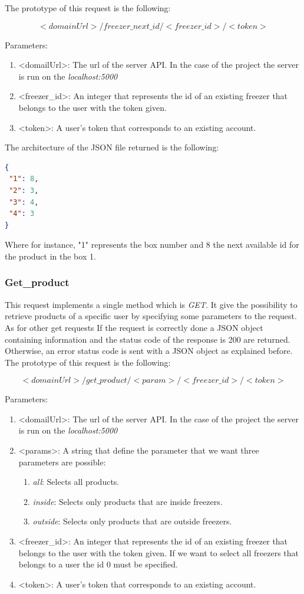 The prototype of this request is the following:

$$<domainUrl>/freezer\_next\_id/<freezer\_id>/<token>$$

Parameters:
\begin{enumerate}
\item <domailUrl>: The url of the server API. In the case of the project the server is run on the \textit{localhost:5000}
\item <freezer\_id>: An integer that represents the id of an existing freezer that belongs to the user with the token given.
\item <token>: A user's token that corresponds to an existing account.
\end{enumerate}

The architecture of the JSON file returned is the following:
\begin{lstlisting}[language=json]
{
 "1": 8, 
 "2": 3, 
 "3": 4, 
 "4": 3
}
\end{lstlisting}
Where for instance, "1" represents the box number and 8 the next available id for the product in the box 1.

\subsubsection{Get\_product}
This request implements a single method which is \textit{GET}. It give the possibility to retrieve products of a specific user by specifying some parameters to the request. As for other get requests If the request is correctly done a JSON object containing information and the status code of the response is 200 are returned. Otherwise, an error status code is sent with a JSON object as explained before.\\

The prototype of this request is the following:

$$<domainUrl>/get\_product/<param>/<freezer\_id>/<token>$$

Parameters:
\begin{enumerate}
\item <domailUrl>: The url of the server API. In the case of the project the server is run on the \textit{localhost:5000}
\item <params>: A string that define the parameter that we want three parameters are possible:
\begin{enumerate}
\item \textit{all}: Selects all products.
\item \textit{inside}: Selects only products that are inside freezers.
\item \textit{outside}: Selects only products that are outside freezers.
\end{enumerate}
\item <freezer\_id>: An integer that represents the id of an existing freezer that belongs to the user with the token given. If we want to select all freezers that belongs to a user the id 0 must be specified.
\item <token>: A user's token that corresponds to an existing account.
\end{enumerate}

